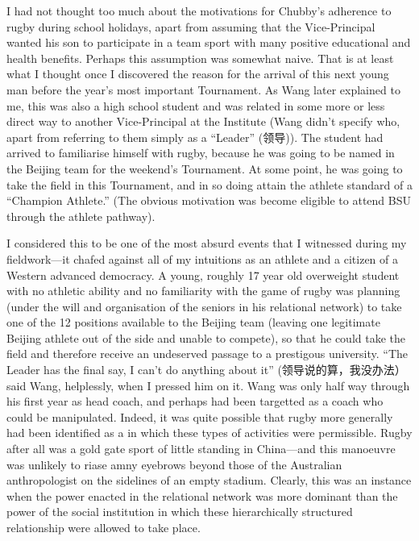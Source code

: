 I had not thought too much about the motivations for Chubby's adherence to rugby during school holidays, apart from assuming that the Vice-Principal wanted his son to participate in a team sport with many positive educational and health benefits.  Perhaps this assumption was somewhat naive.  That is at least what I thought once I discovered the reason for the arrival of this next young man before the year's most important Tournament.  As Wang later explained to me, this was also a high school student and was related in some more or less direct way to another Vice-Principal at the Institute (Wang didn't specify who, apart from referring to them simply as a ``Leader'' (领导)).  The student had arrived to familiarise himself with rugby, because he was going to be named in the Beijing team for the weekend's Tournament.  At some point, he was going to take the field in this Tournament, and in so doing attain the athlete standard of a ``Champion Athlete.''  (The obvious motivation was become eligible to attend BSU through the athlete pathway).

I considered this to be one of the most absurd events that I witnessed during my fieldwork---it chafed against all of my intuitions as an athlete and a citizen of a Western advanced democracy.  A young, roughly 17 year old overweight student with no athletic ability and no familiarity with the game of rugby was planning (under the will and organisation of the seniors in his relational network) to take one of the 12 positions available to the Beijing team (leaving one legitimate Beijing athlete out of the side and unable to compete), so that he could take the field and therefore receive an undeserved passage to a prestigous university.  ``The Leader has the final say, I can't do anything about it'' (领导说的算，我没办法）said Wang, helplessly, when I pressed him on it.  Wang was only half way through his first year as head coach, and perhaps had been targetted as a coach who could be manipulated.  Indeed, it was quite possible that rugby more generally had been identified as a in which these types of activities were permissible.  Rugby after all was a gold gate sport of little standing in China---and this manoeuvre was unlikely to riase amny eyebrows beyond those of the Australian anthropologist on the sidelines of an empty stadium. Clearly, this was an instance when the power enacted in the relational network was more dominant than the power of the social institution in which these hierarchically structured relationship were allowed to take place.

